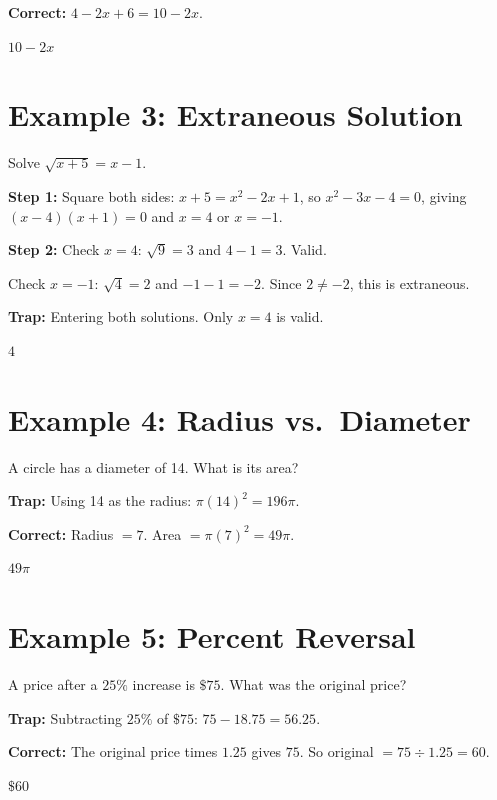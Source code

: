 \documentclass[14pt]{extarticle}
\begin{document}
\textbf{Correct:} \(4 - 2x + 6 = 10 - 2x\).

\(\boxed{10 - 2x}\)

\section*{Example 3: Extraneous Solution}

Solve \(\sqrt{x + 5} = x - 1\).

\textbf{Step 1:} Square both sides: \(x + 5 = x^2 - 2x + 1\), so \(x^2 - 3x - 4 = 0\), giving \((x - 4)(x + 1) = 0\) and \(x = 4\) or \(x = -1\).

\textbf{Step 2:} Check \(x = 4\): \(\sqrt{9} = 3\) and \(4 - 1 = 3\). Valid.

Check \(x = -1\): \(\sqrt{4} = 2\) and \(-1 - 1 = -2\). Since \(2 \neq -2\), this is extraneous.

\textbf{Trap:} Entering both solutions. Only \(x = 4\) is valid.

\(\boxed{4}\)

\section*{Example 4: Radius vs.\ Diameter}

A circle has a diameter of 14. What is its area?

\textbf{Trap:} Using 14 as the radius: \(\pi(14)^2 = 196\pi\).

\textbf{Correct:} Radius \(= 7\). Area \(= \pi(7)^2 = 49\pi\).

\(\boxed{49\pi}\)

\section*{Example 5: Percent Reversal}

A price after a \(25\%\) increase is \(\$75\). What was the original price?

\textbf{Trap:} Subtracting \(25\%\) of \(\$75\): \(75 - 18.75 = 56.25\).

\textbf{Correct:} The original price times \(1.25\) gives \(75\). So original \(= 75 \div 1.25 = 60\).

\(\boxed{\$60}\)
\end{document}
